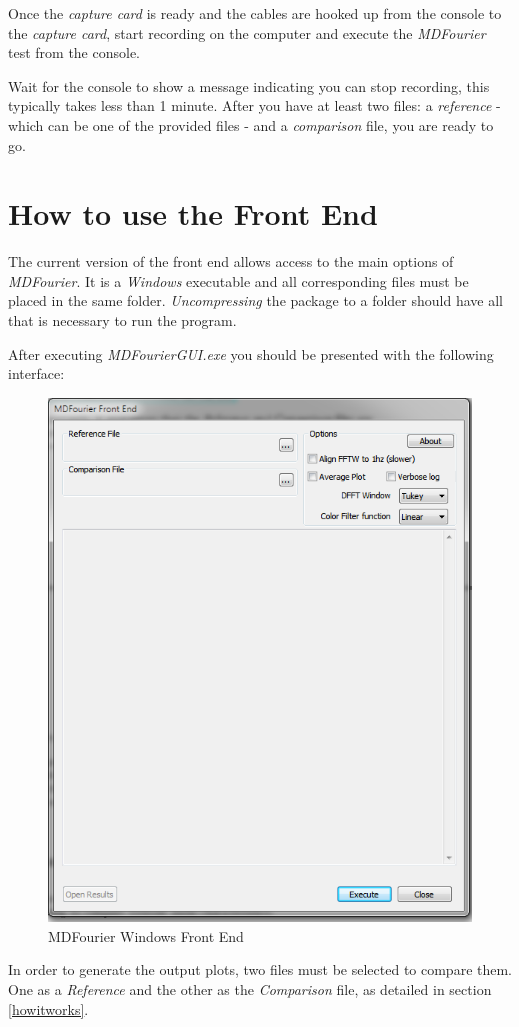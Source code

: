 \documentclass[10pt,a4paper]{report}
\begin{document}
Once the \textit{capture card} is ready and the cables are hooked up from the console to the \textit{capture card}, start recording on the computer and execute the \textit{MDFourier} test from the console.

Wait for the console to show a message indicating you can stop recording, this typically takes less than 1 minute. After you have at least two files: a \textit{reference} - which can be one of the provided files -  and a \textit{comparison} file, you are ready to go. 

\chapter{How to use the Front End}
\label{usinggui}
The current version of the front end allows access to the main options of \textit{MDFourier}. It is a \textit{Windows} executable and all corresponding files must be placed in the same folder. \textit{Uncompressing} the package to a folder should have all that is necessary to run the program.

After executing \textit{MDFourierGUI.exe} you should be presented with the following interface:

\begin{figure}[H]
	\centering
	\includegraphics[width=0.6\linewidth]{plots/GUI1.png}
	\caption[Front End]{MDFourier Windows Front End}
	\label{fig:gui1}
\end{figure}

In order to generate the output plots, two files must be selected to compare them. One as a \textit{Reference} and the other as the \textit{Comparison} file, as detailed in section \ref{howitworks}.
\end{document}
